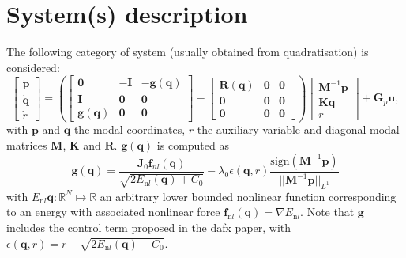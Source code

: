 \documentclass[9pt]{scrartcl}
\newcommand{\mat}[1]{\mathbf {#1}}
\newcommand{\matO}{\mat 0}
\begin{document}
  \section{System(s) description}

  The following category of system (usually obtained from quadratisation) is considered:
  \begin{subequations}
  \begin{equation}
    \begin{bmatrix}
      \dot{\mat p} \\
      \dot{\mat q} \\
      \dot r
    \end{bmatrix}
    =
    \left(
    \begin{bmatrix}
      \matO & -\mat I & - \mat g(\mat q) \\
      \mat I & \matO & \matO \\
      \mat g(\mat q) & \matO & \mat 0 
    \end{bmatrix}
    -
    \begin{bmatrix}
      \mat R (\mat q) & \matO & \matO \\
      \matO & \matO & \matO \\
      \matO & \matO & \matO
    \end{bmatrix}
    \right)
    \begin{bmatrix}
      \mat M^{-1} \mat p \\
      \mat K \mat q \\
      r
    \end{bmatrix}
    + \mat G_p \mat u,
  \end{equation}
  \end{subequations}
  with $ \mat p$ and $\mat q$ the modal coordinates, $r$ the auxiliary variable and diagonal modal matrices $\mat M$, $\mat K$ and $\mat R$. $\mat g(\mat q)$ is computed as 
  \begin{equation}
    \mat g(\mat q) = \frac{\mat J_0 \mat f_{nl}(\mat q)}{\sqrt{2 E_{\mathrm nl} (\mat q) + C_0}} 
    - \lambda_0 \epsilon(\mat q, r) \frac{\mathrm{sign}(\mat M^{-1} \mat p) }{\vert\vert \mat M^{-1} \mat p\vert\vert_{L^1}}
  \end{equation}
	with $E_{\mathrm nl} \mat q: \mathbb R^N \mapsto \mathbb R$ an arbitrary lower bounded nonlinear function corresponding to an energy with associated nonlinear force $\mat f_{\mathrm nl} (\mat q) = \nabla E_{\mathrm nl}$. Note that $\mat g$ includes the control term proposed in the dafx paper, with $\epsilon (\mat q, r) = r - \sqrt{2 E_{\mathrm nl} (\mat q) + C_0}$.
\end{document}
